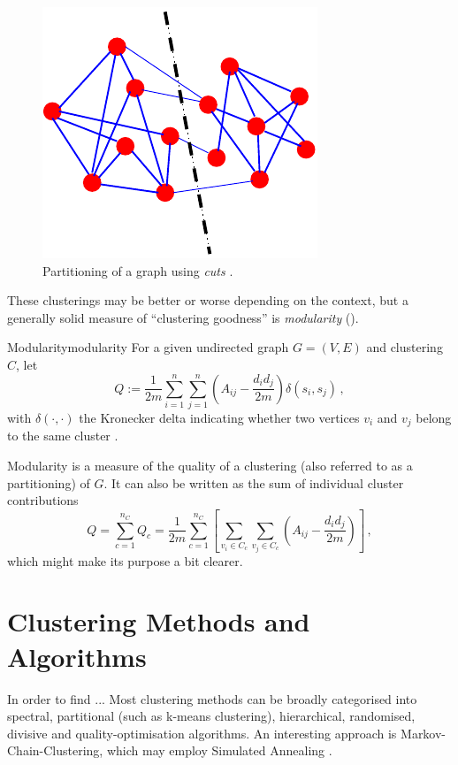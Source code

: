 \documentclass[12pt, a4paper]{article}
\begin{document}
  \begin{figure}[h]
    \centering
    \includegraphics[width=0.3\linewidth]{figures/graphpartitioning.pdf}
    \caption{Partitioning of a graph using \textit{cuts} \parencite{fortunato-2009}.}
  \end{figure}

  These clusterings may be better or worse depending on the context, but a generally solid measure of ``clustering goodness'' is \textit{modularity} ().

  \begin{definition}{Modularity}{modularity}
    For a given undirected graph $G = (V, E)$ and clustering $C$, let $$Q := \frac{1}{2m} \sum_{i=1}^{n} \sum_{j=1}^{n} \left(A_{ij} - \frac{d_i d_j}{2m}\right) \delta(s_i, s_j)\,,$$ with $\delta(\cdot, \cdot)$ the Kronecker delta indicating whether two vertices $v_i$ and $v_j$ belong to the same cluster \parencite{lambiotte-louvain-clustering}.
  \end{definition}

  Modularity is a measure of the quality of a clustering (also referred to as a partitioning) of $G$. It can also be written as the sum of individual cluster contributions
  $$Q = \sum_{c=1}^{n_C} Q_c = \frac{1}{2m} \sum_{c=1}^{n_C} \left[\sum_{v_i \in C_c} \sum_{v_j \in C_c} \left(A_{ij} - \frac{d_i d_j}{2m}\right)\right]\,,$$
  which might make its purpose a bit clearer.

  \section{Clustering Methods and Algorithms}
  In order to find ...
  Most clustering methods can be broadly categorised into spectral, partitional (such as k-means clustering), hierarchical, randomised, divisive and quality-optimisation algorithms.
  An interesting approach is Markov-Chain-Clustering, which may employ Simulated Annealing \cite{fortunato}.
\end{document}
